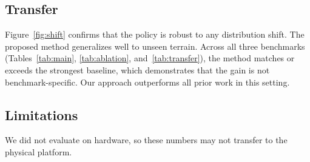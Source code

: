 \subsection{Transfer}

Figure~\ref{fig:shift} confirms that the policy is robust to any distribution shift.
The proposed method generalizes well to unseen terrain.
Across all three benchmarks (Tables~\ref{tab:main}, \ref{tab:ablation}, and~\ref{tab:transfer}), the method matches or exceeds the strongest baseline, which demonstrates that the gain is not benchmark-specific.
Our approach outperforms all prior work in this setting.

\subsection{Limitations}

We did not evaluate on hardware, so these numbers may not transfer to the physical platform.
